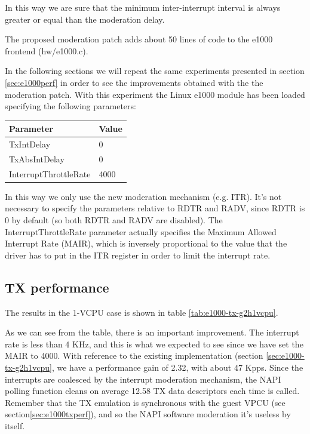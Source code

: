 In this way we are sure that the minimum inter-interrupt interval is always greater or equal than the moderation delay.

\vspace{0.5cm}

The proposed moderation patch adds about 50 lines of code to the e1000 frontend (hw/e1000.c).

\vspace{0.5cm}

In the following sections we will repeat the same experiments presented in section \ref{sec:e1000perf} in order to see the improvements
obtained with the the moderation patch. With this experiment the Linux e1000 module has been loaded specifying the following parameters:
\begin{center}
\begin{tabular}{ll}
\toprule
\textbf{Parameter} & \textbf{Value}\\
\midrule
TxIntDelay & 0\\
TxAbsIntDelay & 0\\
InterruptThrottleRate & 4000\\
\bottomrule
\end{tabular}
\end{center}

In this way we only use the new moderation mechanism (e.g. ITR). It's not necessary to specify the parameters relative to RDTR and
RADV, since RDTR is 0 by default (so both RDTR and RADV are disabled). The InterruptThrottleRate parameter actually specifies the Maximum
Allowed Interrupt Rate (MAIR), which is inversely proportional to the value that the driver has to put in the ITR register in order to limit
the interrupt rate.

\subsection{TX performance}
\label{sec:e1000-mit-tx}
The results in the 1-VCPU case is shown in table \ref{tab:e1000-tx-g2h1vcpu}.

As we can see from the table, there is an important improvement. The interrupt rate is less than 4 KHz, and this is what we expected to see
since we have set the MAIR to 4000.
With reference to the existing implementation (section \ref{sec:e1000-tx-g2h1vcpu}, we have a performance gain of 2.32, with about 47 Kpps.
Since the interrupts are coalesced by the interrupt moderation mechanism, the NAPI polling function cleans on average 12.58 TX data 
descriptors each time is called. Remember that the TX emulation is synchronous with the guest VPCU (see section\ref{sec:e1000txperf}), and
so the NAPI software moderation it's useless by itself.

